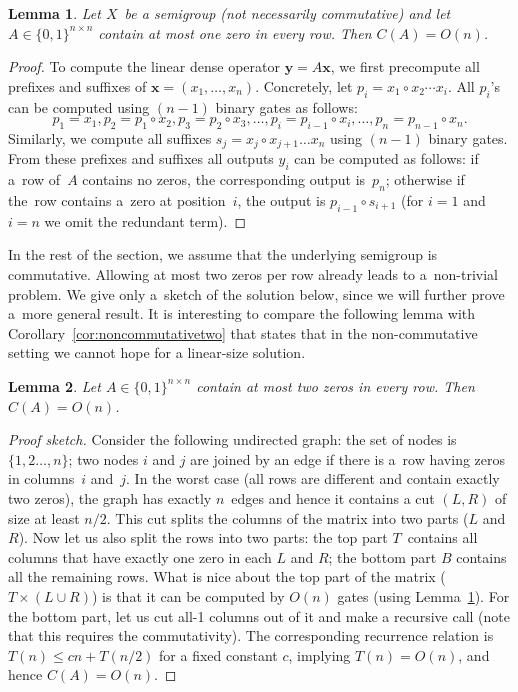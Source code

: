 \documentclass[11pt,letterpaper]{article}
\newtheorem{lemma}{Lemma}
\begin{document}
\begin{lemma}\label{lemma:easy}
Let $X$~be a semigroup (not necessarily commutative) and let
$A \in \{0,1\}^{n \times n}$ contain at most one zero in every row. Then
$C(A) = O(n)$.
\end{lemma}
\begin{proof}
To compute the linear dense operator $\mathbf{y} = A \mathbf{x}$, we first
precompute all prefixes and suffixes of $\mathbf{x}=(x_1, \dotsc, x_n)$.
Concretely, let $p_i=x_1 \circ x_2 \dotsb x_i$. All $p_i$'s can be computed
using $(n-1)$ binary gates as follows:
\[
p_1=x_1, p_2=p_1 \circ x_2, p_3=p_2 \circ x_3, \dotsc, p_i=p_{i-1} \circ x_i, \dotsc, p_n=p_{n-1}\circ x_n.
\]
Similarly, we compute all suffixes $s_j=x_j \circ x_{j+1} \dotsc x_n$ using
$(n-1)$ binary gates. From these prefixes and suffixes all outputs $y_i$ can be
computed as follows: if a~row of~$A$ contains no zeros, the corresponding
output is~$p_n$; otherwise if the~row contains a~zero at position~$i$, the
output is $p_{i-1} \circ s_{i+1}$ (for $i=1$ and $i=n$ we omit the redundant
term).
\end{proof}

In the rest of the section, we assume that the underlying semigroup is
commutative. Allowing at most two zeros per row already leads to a~non-trivial
problem. We give only a~sketch of the solution below, since we will further
prove a~more general result. It is interesting to compare the following lemma
with Corollary~\ref{cor:noncommutativetwo} that states that in the
non-commutative setting we cannot hope for a linear-size solution.

\begin{lemma} \label{lem:at_most_2}
Let $A \in \{0,1\}^{n \times n}$ contain at most two zeros in every row. Then
$C(A) = O(n)$.
\end{lemma}
\begin{proof}[Proof sketch]
Consider the following undirected graph: the set of nodes is $\{1,2\dots,n\}$;
two nodes $i$ and $j$ are joined by an edge if there is a~row having zeros in
columns~$i$ and~$j$. In the worst case (all rows are different and contain
exactly two zeros), the graph has exactly $n$~edges and hence it contains a cut
$(L,R)$ of size at least $n/2$. This cut splits the columns of the matrix into
two parts ($L$ and $R$). Now let us also split the rows into two parts: the top
part $T$~contains all columns that have exactly one zero in each $L$ and $R$;
the bottom part $B$ contains all the remaining rows. What is nice about the top
part of the matrix ($T \times (L \cup R)$) is that it can be computed by $O(n)$
gates (using Lemma~\ref{lemma:easy}). For the bottom part, let us cut all-1
columns out of it and make a recursive call (note that this requires the
commutativity). The corresponding recurrence relation is $T(n) \le cn + T(n/2)$
for a fixed constant $c$, implying $T(n)=O(n)$, and hence $C(A) = O(n)$.
\end{proof}
\end{document}
